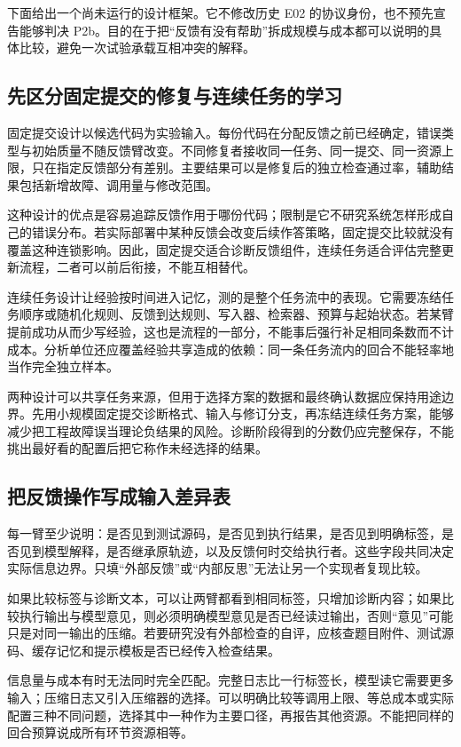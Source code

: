 下面给出一个尚未运行的设计框架。它不修改历史 E02 的协议身份，也不预先宣告能够判决 P2b。目的在于把“反馈有没有帮助”拆成规模与成本都可以说明的具体比较，避免一次试验承载互相冲突的解释。

\subsection{先区分固定提交的修复与连续任务的学习}

固定提交设计以候选代码为实验输入。每份代码在分配反馈之前已经确定，错误类型与初始质量不随反馈臂改变。不同修复者接收同一任务、同一提交、同一资源上限，只在指定反馈部分有差别。主要结果可以是修复后的独立检查通过率，辅助结果包括新增故障、调用量与修改范围。

这种设计的优点是容易追踪反馈作用于哪份代码；限制是它不研究系统怎样形成自己的错误分布。若实际部署中某种反馈会改变后续作答策略，固定提交比较就没有覆盖这种连锁影响。因此，固定提交适合诊断反馈组件，连续任务适合评估完整更新流程，二者可以前后衔接，不能互相替代。

连续任务设计让经验按时间进入记忆，测的是整个任务流中的表现。它需要冻结任务顺序或随机化规则、反馈到达规则、写入器、检索器、预算与起始状态。若某臂提前成功从而少写经验，这也是流程的一部分，不能事后强行补足相同条数而不计成本。分析单位还应覆盖经验共享造成的依赖：同一条任务流内的回合不能轻率地当作完全独立样本。

两种设计可以共享任务来源，但用于选择方案的数据和最终确认数据应保持用途边界。先用小规模固定提交诊断格式、输入与修订分支，再冻结连续任务方案，能够减少把工程故障误当理论负结果的风险。诊断阶段得到的分数仍应完整保存，不能挑出最好看的配置后把它称作未经选择的结果。

\subsection{把反馈操作写成输入差异表}

每一臂至少说明：是否见到测试源码，是否见到执行结果，是否见到明确标签，是否见到模型解释，是否继承原轨迹，以及反馈何时交给执行者。这些字段共同决定实际信息边界。只填“外部反馈”或“内部反思”无法让另一个实现者复现比较。

如果比较标签与诊断文本，可以让两臂都看到相同标签，只增加诊断内容；如果比较执行输出与模型意见，则必须明确模型意见是否已经读过输出，否则“意见”可能只是对同一输出的压缩。若要研究没有外部检查的自评，应核查题目附件、测试源码、缓存记忆和提示模板是否已经传入检查结果。

信息量与成本有时无法同时完全匹配。完整日志比一行标签长，模型读它需要更多输入；压缩日志又引入压缩器的选择。可以明确比较等调用上限、等总成本或实际配置三种不同问题，选择其中一种作为主要口径，再报告其他资源。不能把同样的回合预算说成所有环节资源相等。

